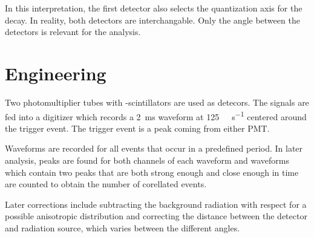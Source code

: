 In this interpretation, the first detector also selects the quantization axis for the decay.
In reality, both detectors are interchangable.
Only the angle between the detectors is relevant for the analysis.

\section{Engineering}
Two photomultiplier tubes with -scintillators are used as  detecors.
The signals are fed into a digitizer which records a \SI{2}{\ms} waveform at \SI{125}{\kilo\samples\per\second} centered around the trigger event.
The trigger event is a peak coming from either PMT.

Waveforms are recorded for all events that occur in a predefined period.
In later analysis, peaks are found for both channels of each waveform and waveforms which contain two peaks that are both strong enough and close enough in time are counted to obtain the number of corellated events.

Later corrections include subtracting the background radiation with respect for a possible anisotropic distribution and correcting the distance between the detector and radiation source, which varies between the different angles.
